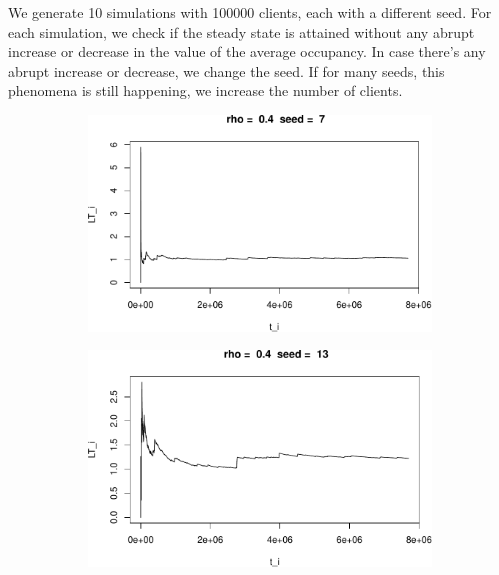 \documentclass[]{article}
\begin{document}
We generate 10 simulations with 100000 clients, each with a different
seed. For each simulation, we check if the steady state is attained
without any abrupt increase or decrease in the value of the average
occupancy. In case there's any abrupt increase or decrease, we change
the seed. If for many seeds, this phenomena is still happening, we
increase the number of clients.



\begin{figure}[h!]
\begin{subfigure}[b]{.55\linewidth}

\includegraphics[width=\linewidth]{003_files/figure-latex/unnamed-chunk-13-1.pdf}
\end{subfigure}\hfill
\begin{subfigure}[b]{.55\linewidth}
\includegraphics[width=\linewidth]{003_files/figure-latex/unnamed-chunk-13-2.pdf}
\end{subfigure}\vfill
\end{figure}
\end{document}

